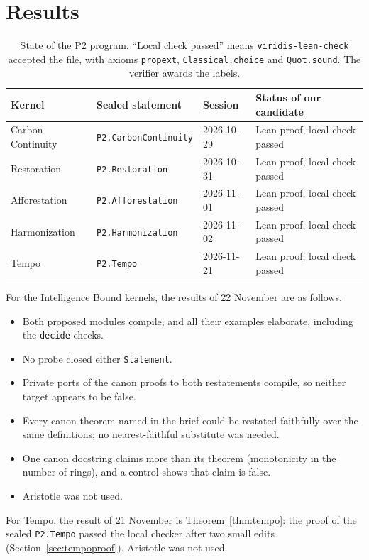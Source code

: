 \documentclass[11pt]{article}
\theoremstyle{definition}
\theoremstyle{remark}
\begin{document}
\section{Results}
\begin{table}[h]
\centering\small
\begin{tabular}{@{}llll@{}}
\toprule
Kernel & Sealed statement & Session & Status of our candidate \\
\midrule
Carbon Continuity & \texttt{P2.CarbonContinuity} & 2026-10-29 & Lean proof, local check passed \\
Restoration & \texttt{P2.Restoration} & 2026-10-31 & Lean proof, local check passed \\
Afforestation & \texttt{P2.Afforestation} & 2026-11-01 & Lean proof, local check passed \\
Harmonization & \texttt{P2.Harmonization} & 2026-11-02 & Lean proof, local check passed \\
Tempo & \texttt{P2.Tempo} & 2026-11-21 & Lean proof, local check passed \\
\bottomrule
\end{tabular}
\caption{State of the P2 program. ``Local check passed'' means \texttt{viridis-lean-check} accepted the file, with axioms
\texttt{propext}, \texttt{Classical.choice} and \texttt{Quot.sound}. The verifier awards the labels.}
\end{table}
For the Intelligence Bound kernels, the results of 22 November are as follows.
\begin{itemize}
\item Both proposed modules compile, and all their examples elaborate, including the \texttt{decide} checks.
\item No probe closed either \texttt{Statement}.
\item Private ports of the canon proofs to both restatements compile, so neither target appears to be false.
\item Every canon theorem named in the brief could be restated faithfully over the same definitions; no nearest-faithful
substitute was needed.
\item One canon docstring claims more than its theorem (monotonicity in the number of rings), and a control shows that claim is false.
\item Aristotle was not used.
\end{itemize}

For Tempo, the result of 21 November is Theorem~\ref{thm:tempo}: the proof of the sealed \texttt{P2.Tempo} passed the local checker
after two small edits (Section~\ref{sec:tempoproof}). Aristotle was not used.
\end{document}
